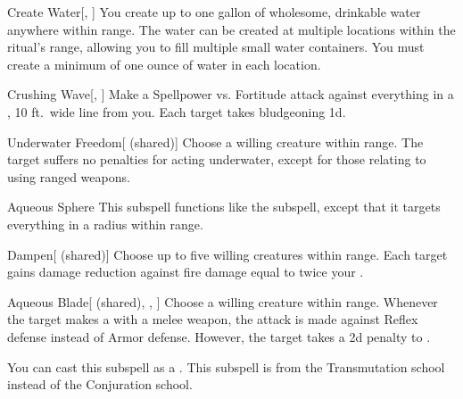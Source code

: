 \begin{ability}[\nth{1}]{Create Water}[, ]
You create up to one gallon of wholesome, drinkable water anywhere within \rngclose range.
The water can be created at multiple locations within the ritual's range, allowing you to fill multiple small water containers.
You must create a minimum of one ounce of water in each location.
\end{ability}
\vspace{0.25em}


\begin{ability}[\nth{1}]{Crushing Wave}[, ]
Make a Spellpower vs. Fortitude attack against everything in a \arealarge, 10 ft.\ wide line from you.
\hit Each target takes bludgeoning  \minus1d.
\end{ability}
\vspace{0.25em}


\begin{ability}[\nth{1}]{Underwater Freedom}[ (shared)]
Choose a willing creature within \rngclose range.
The target suffers no penalties for acting underwater, except for those relating to using ranged weapons.
\end{ability}
\vspace{0.25em}


\begin{ability}[\nth{2}]{Aqueous Sphere}
This subspell functions like the  subspell, except that it targets everything in a \areasmall radius within \rngclose range.
\end{ability}
\vspace{0.25em}


\begin{ability}[\nth{2}]{Dampen}[ (shared)]
Choose up to five willing creatures within \rngclose range.
Each target gains damage reduction against fire damage equal to twice your .
\end{ability}
\vspace{0.25em}


\begin{ability}[\nth{3}]{Aqueous Blade}[ (shared), , ]
Choose a willing creature within \rngclose range.
Whenever the target makes a  with a melee weapon, the attack is made against Reflex defense instead of Armor defense.
However, the target takes a \minus2d penalty to .

You can cast this subspell as a .
This subspell is from the Transmutation school instead of the Conjuration school.
\end{ability}
\vspace{0.25em}


